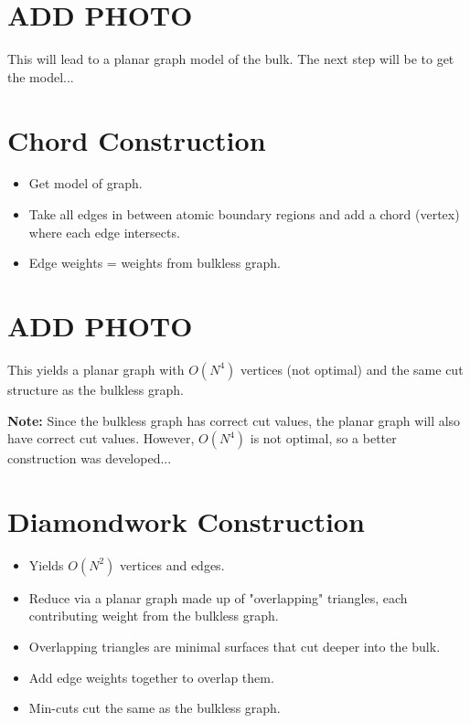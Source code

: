 \documentclass{article}
\begin{document}
\section{ADD PHOTO}

This will lead to a planar graph model of the bulk. The next step will be to get the model...

\section{Chord Construction}
\begin{itemize}
    \item Get model of graph.
    \item Take all edges in between atomic boundary regions and add a chord (vertex) where each edge intersects.
    \item Edge weights = weights from bulkless graph.
\end{itemize}

\section{ADD PHOTO}

This yields a planar graph with \( O(N^4) \) vertices (not optimal) and the same cut structure as the bulkless graph.

\textbf{Note:} Since the bulkless graph has correct cut values, the planar graph will also have correct cut values. However, \( O(N^4) \) is not optimal, so a better construction was developed...

\section{Diamondwork Construction}
\begin{itemize}
    \item Yields \( O(N^2) \) vertices and edges.
    \item Reduce via a planar graph made up of "overlapping" triangles, each contributing weight from the bulkless graph.
    \item Overlapping triangles are minimal surfaces that cut deeper into the bulk.
    \item Add edge weights together to overlap them.
    \item Min-cuts cut the same as the bulkless graph.
\end{itemize}
\end{document}
